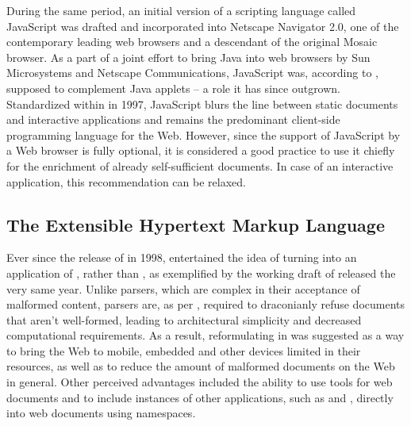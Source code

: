 \documentclass{book}
\begin{document}
        During the same period, an initial version of a scripting language
        called JavaScript was drafted and incorporated into Netscape Navigator
        2.0, one of the contemporary leading web browsers and a descendant of
        the original Mosaic browser. As a part of a joint effort to bring Java
        into web browsers by Sun Microsystems and Netscape Communications,
        JavaScript was, according to \cite{js-announcement}, supposed to
        complement Java applets -- a role it has since outgrown. Standardized
        within \cite{ecma1} in 1997, JavaScript blurs the line between static
        documents and interactive applications and remains the predominant
        client-side programming language for the Web.  However, since the
        support of JavaScript by a Web browser is fully optional, it is
        considered a good practice to use it chiefly for the enrichment of
        already self-sufficient  documents. In case of an
        interactive application, this recommendation can be relaxed.

      \subsection{The Extensible Hypertext Markup Language}
        Ever since the release of  in 1998, 
        entertained the idea of turning  into an application of
        , rather than , as exemplified by the working
        draft of \cite{raggett98} released the very same year. Unlike
         parsers, which are complex in their acceptance of
        malformed content,  parsers are, as per \cite[Section~1.2,
        Terminology]{bray98}, required to draconianly refuse 
        documents that aren't well-formed, leading to architectural simplicity
        and decreased computational requirements. As a result, reformulating
         in  was suggested as a way to bring the Web
        to mobile, embedded and other devices limited in their resources, as
        well as to reduce the amount of malformed documents on the Web in
        general. Other perceived advantages included the ability to use
         tools for web documents and to include instances of other
         applications, such as  and ,
        directly into web documents using  namespaces.
\end{document}
